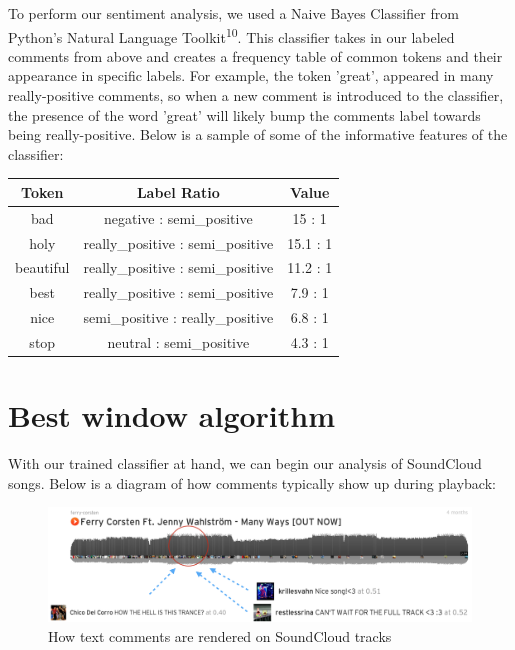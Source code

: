 \documentclass[12pt]{dalcsthesis}
\begin{document}
To perform our sentiment analysis, we used a Naive Bayes Classifier from Python's Natural Language Toolkit\textsuperscript{10}. This classifier takes in our labeled comments from above and creates a frequency table of common tokens and their appearance in specific labels. For example, the token 'great', appeared in many really-positive comments, so when a new comment is introduced to the classifier, the presence of the word 'great' will likely bump the comments label towards being really-positive. Below is a sample of some of the informative features of the classifier:

\begin{center}
  \begin{tabular}{ c | c | c }
    \hline
    \textbf{Token} & \textbf{Label Ratio} & \textbf{Value} \\ \hline
    bad & negative : semi\_positive & 15 : 1 \\ \hline
    holy & really\_positive : semi\_positive & 15.1 : 1 \\ \hline
    beautiful & really\_positive : semi\_positive & 11.2 : 1 \\ \hline
    best & really\_positive : semi\_positive & 7.9 : 1 \\ \hline
    nice & semi\_positive : really\_positive & 6.8 : 1 \\ \hline
    stop & neutral : semi\_positive & 4.3 : 1 \\
    \hline
  \end{tabular}
\end{center}

\section{Best window algorithm}

With our trained classifier at hand, we can begin our analysis of SoundCloud songs. Below is a diagram of how comments typically show up during playback:  

\begin{figure}[h]
\includegraphics[scale=.45]{example_comments}
\centering
\caption{How text comments are rendered on SoundCloud tracks}
\end{figure}
\end{document}
